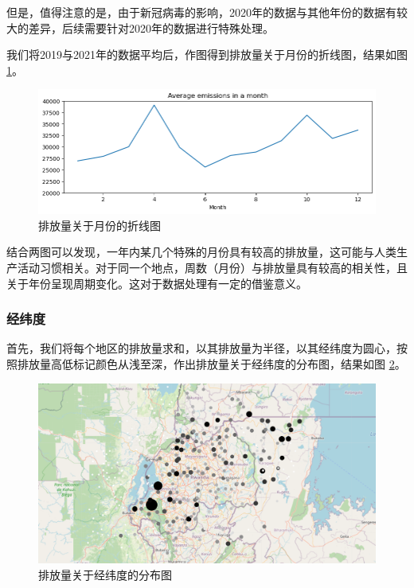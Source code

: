 \documentclass{ctexart}
\begin{document}
\begin{sloppypar}
但是，值得注意的是，由于新冠病毒的影响，2020年的数据与其他年份的数据有较大的差异，后续需要针对2020年的数据进行特殊处理。

我们将2019与2021年的数据平均后，作图得到排放量关于月份的折线图，结果如图 \ref{fig:3}。

\begin{figure}[H]
      \centering
      \includegraphics[width=1\textwidth]{output3.png}
      \caption{\label{fig:3}排放量关于月份的折线图}
\end{figure}

结合两图可以发现，一年内某几个特殊的月份具有较高的排放量，这可能与人类生产活动习惯相关。对于同一个地点，周数（月份）与排放量具有较高的相关性，且关于年份呈现周期变化。这对于数据处理有一定的借鉴意义。

\subsubsection{经纬度}

首先，我们将每个地区的排放量求和，以其排放量为半径，以其经纬度为圆心，按照排放量高低标记颜色从浅至深，作出排放量关于经纬度的分布图，结果如图 \ref{fig:9}。

\begin{figure}[H]
      \centering
      \includegraphics[width=1\textwidth]{output9.png}
      \caption{\label{fig:9}排放量关于经纬度的分布图}
\end{figure}


\end{sloppypar}
\end{document}
